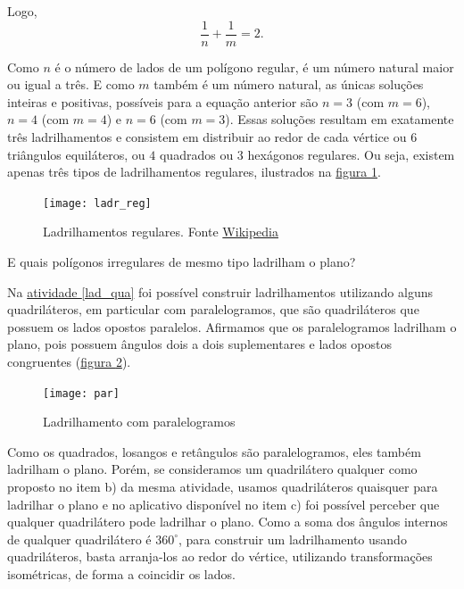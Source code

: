 Logo,
\begin{equation*}
\frac{1}{n}+\frac{1}{m}=2.
\end{equation*}

Como $n$ é o número de lados de um polígono regular, é um número natural maior ou igual a três. E como $m$ também é um número natural, as únicas soluções inteiras e positivas, possíveis para a equação anterior são $n=3$ (com $m=6$), $n=4$ (com $m=4$) e $n=6$ (com $m=3$). Essas soluções resultam em exatamente três ladrilhamentos e consistem em distribuir ao redor de cada vértice ou $6$ triângulos equiláteros, ou $4$ quadrados ou $3$ hexágonos regulares. Ou seja, existem apenas três tipos de ladrilhamentos regulares, ilustrados na \hyperref[ladr_reg]{figura \ref{ladr_reg}}.



\begin{figure}[H]
\centering
\texttt{[image: ladr\_reg]}
\caption{Ladrilhamentos regulares. Fonte \href{https://en.wikipedia.org/wiki/Euclidean_tilings_by_convex_regular_polygons}{Wikipedia}}
\label{ladr_reg}
\end{figure}



E quais polígonos irregulares de mesmo tipo ladrilham o plano?
 
Na \hyperref[lad_qua]{atividade \ref{lad_qua}} foi possível construir ladrilhamentos utilizando alguns quadriláteros, em particular com paralelogramos, que são quadriláteros que possuem os lados opostos paralelos. Afirmamos que os paralelogramos ladrilham o plano, pois possuem ângulos dois a dois suplementares e lados opostos congruentes (\hyperref[par]{figura \ref{par}}).

\begin{figure}[H]
\centering
\texttt{[image: par]}
\caption{Ladrilhamento com paralelogramos}
\label{par}
\end{figure}


Como os quadrados, losangos e retângulos são paralelogramos, eles também ladrilham o plano.
Porém, se consideramos um quadrilátero qualquer como proposto no item b) da mesma atividade, usamos quadriláteros quaisquer para ladrilhar o plano e no aplicativo disponível no item c) foi possível perceber que qualquer quadrilátero pode ladrilhar o plano. Como a  soma dos ângulos internos de qualquer quadrilátero é $360^{\circ}$, para construir um ladrilhamento usando quadriláteros, basta arranja-los ao redor do vértice, utilizando transformações isométricas, de forma a coincidir os lados. 

